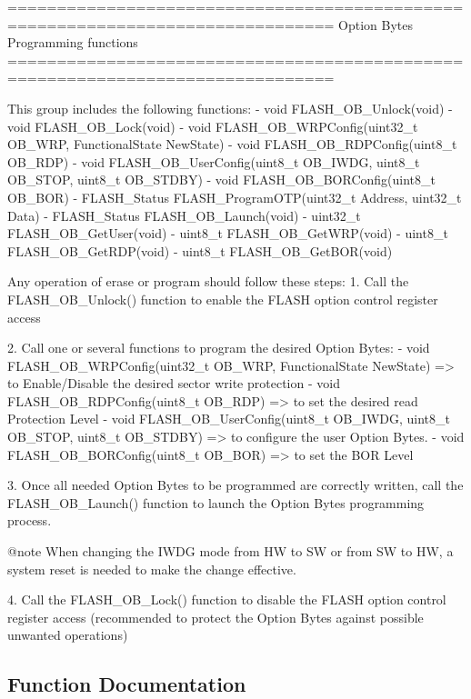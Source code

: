 \begin{DoxyVerb} ===============================================================================
                        Option Bytes Programming functions
 ===============================================================================  
 
   This group includes the following functions:
   - void FLASH_OB_Unlock(void)
   - void FLASH_OB_Lock(void)
   - void FLASH_OB_WRPConfig(uint32_t OB_WRP, FunctionalState NewState)
   - void FLASH_OB_RDPConfig(uint8_t OB_RDP)
   - void FLASH_OB_UserConfig(uint8_t OB_IWDG, uint8_t OB_STOP, uint8_t OB_STDBY)
   - void FLASH_OB_BORConfig(uint8_t OB_BOR)
   - FLASH_Status FLASH_ProgramOTP(uint32_t Address, uint32_t Data)                         
   - FLASH_Status FLASH_OB_Launch(void)
   - uint32_t FLASH_OB_GetUser(void)                        
   - uint8_t FLASH_OB_GetWRP(void)                      
   - uint8_t FLASH_OB_GetRDP(void)                          
   - uint8_t FLASH_OB_GetBOR(void)
   
   Any operation of erase or program should follow these steps:
   1. Call the FLASH_OB_Unlock() function to enable the FLASH option control register access

   2. Call one or several functions to program the desired Option Bytes:
      - void FLASH_OB_WRPConfig(uint32_t OB_WRP, FunctionalState NewState) => to Enable/Disable 
        the desired sector write protection
      - void FLASH_OB_RDPConfig(uint8_t OB_RDP) => to set the desired read Protection Level
      - void FLASH_OB_UserConfig(uint8_t OB_IWDG, uint8_t OB_STOP, uint8_t OB_STDBY) => to configure 
        the user Option Bytes.
      - void FLASH_OB_BORConfig(uint8_t OB_BOR) => to set the BOR Level              

   3. Once all needed Option Bytes to be programmed are correctly written, call the
      FLASH_OB_Launch() function to launch the Option Bytes programming process.
     
     @note When changing the IWDG mode from HW to SW or from SW to HW, a system 
           reset is needed to make the change effective.  

   4. Call the FLASH_OB_Lock() function to disable the FLASH option control register
      access (recommended to protect the Option Bytes against possible unwanted operations)\end{DoxyVerb}
 

\subsection{Function Documentation}
\mbox{\label{group__FLASH__Group3_ga621bf052bc381c7a37fb1f8758f5ec2e}} 
